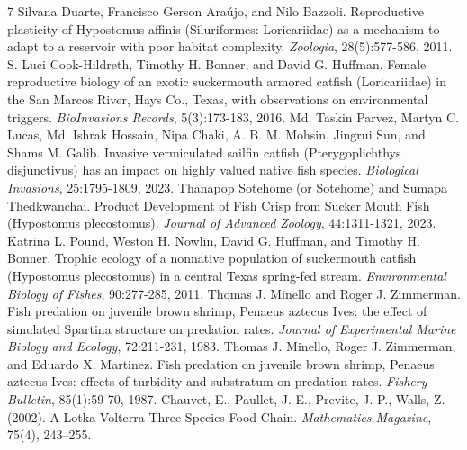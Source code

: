 \documentclass{article}
\begin{document}
\begin{thebibliography}{7} %
Silvana Duarte, Francisco Gerson Araújo, and Nilo Bazzoli. 
Reproductive plasticity of Hypostomus affinis (Siluriformes: Loricariidae) as a mechanism to adapt to a reservoir with poor habitat complexity. \emph{Zoologia}, 28(5):577-586, 2011.
S. Luci Cook-Hildreth, Timothy H. Bonner, and David G. Huffman. Female reproductive biology of an exotic suckermouth armored catfish (Loricariidae) in the San Marcos River, Hays Co., Texas, with observations on environmental triggers. \emph{BioInvasions Records}, 5(3):173-183, 2016.
Md. Taskin Parvez, Martyn C. Lucas, Md. Ishrak Hossain, Nipa Chaki, A. B. M. Mohsin, Jingrui Sun, and Shams M. Galib. Invasive vermiculated sailfin catfish (Pterygoplichthys disjunctivus) has an impact on highly valued native fish species. \emph{Biological Invasions}, 25:1795-1809, 2023.
Thanapop Sotehome (or Sotehome) and Sumapa Thedkwanchai. Product Development of Fish Crisp from Sucker Mouth Fish (Hypostomus plecostomus). \emph{Journal of Advanced Zoology}, 44:1311-1321, 2023.
Katrina L. Pound, Weston H. Nowlin, David G. Huffman, and Timothy H. Bonner. Trophic ecology of a nonnative population of suckermouth catfish (Hypostomus plecostomus) in a central Texas spring-fed stream. \emph{Environmental Biology of Fishes}, 90:277-285, 2011.
Thomas J. Minello and Roger J. Zimmerman. Fish predation on juvenile brown shrimp, Penaeus aztecus Ives: the effect of simulated Spartina structure on predation rates. \emph{Journal of Experimental Marine Biology and Ecology}, 72:211-231, 1983.
Thomas J. Minello, Roger J. Zimmerman, and Eduardo X. Martinez. Fish predation on juvenile brown shrimp, Penaeus aztecus Ives: effects of turbidity and substratum on predation rates. \emph{Fishery Bulletin}, 85(1):59-70, 1987.
Chauvet, E., Paullet, J. E., Previte, J. P., Walls, Z. (2002). A Lotka-Volterra Three-Species Food Chain. \emph{Mathematics Magazine}, 75(4), 243–255.

\end{thebibliography}

\appendix
\end{document}
